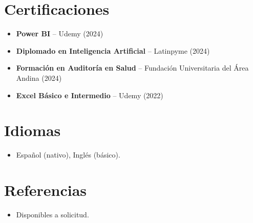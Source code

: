 \documentclass[11pt,a4paper,sans]{moderncv}
\begin{document}

\section{Certificaciones}
\vspace{1pt}
\begin{itemize}
\item \textbf{Power BI} -- Udemy (2024)
\item \textbf{Diplomado en Inteligencia Artificial} -- Latinpyme (2024)
\item \textbf{Formación en Auditoría en Salud} -- Fundación Universitaria del Área Andina (2024)
\item \textbf{Excel Básico e Intermedio} -- Udemy (2022)
\end{itemize}


\section{Idiomas}
\vspace{1pt}
\begin{itemize}
\item Español (nativo), Inglés (básico).
\end{itemize}


\section{Referencias}
\vspace{1pt}
\begin{itemize}
\item{Disponibles a solicitud.}
\end{itemize}
\end{document}
